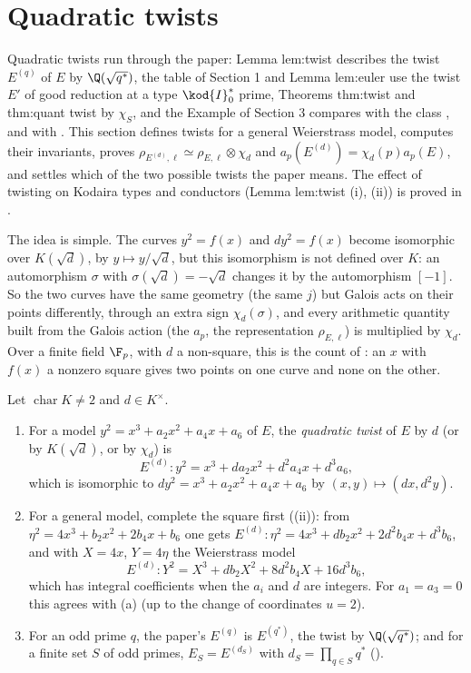 \section{Quadratic twists}\label{sec:ellcurves:twists}

Quadratic twists run through the paper: Lemma lem:twist describes the twist $E^{(q)}$ of $E$ by $\Q(\sqrt{q^*})$, the table of Section 1 and Lemma lem:euler use the twist $E'$ of good reduction at a
type $\kod{I}_0^*$ prime, Theorems thm:twist and thm:quant twist by $\chi_S$, and the Example of Section 3 compares  with the class , and  with . This
section defines twists for a general Weierstrass model, computes their invariants, proves $\rho_{E^{(d)},\ell}\simeq\rho_{E,\ell}\otimes\chi_d$ and $a_p(E^{(d)})=\chi_d(p)a_p(E)$, and settles which of
the two possible twists the paper means. The effect of twisting on Kodaira types and conductors (Lemma lem:twist (i), (ii)) is proved in .

The idea is simple. The curves $y^2=f(x)$ and $dy^2=f(x)$ become isomorphic over $K(\sqrt d)$, by $y\mapsto y/\sqrt d$, but this isomorphism is not defined over $K$:
an automorphism $\sigma$ with $\sigma(\sqrt d)=-\sqrt d$ changes it by the automorphism $[-1]$. So the two curves have the same geometry (the same $j$) but Galois acts on
their points differently, through an extra sign $\chi_d(\sigma)$, and every arithmetic quantity built from the Galois action (the $a_p$, the representation $\rho_{E,\ell}$) is
multiplied by $\chi_d$. Over a finite field $\F_p$, with $d$ a non-square, this is the count of : an $x$ with $f(x)$ a nonzero square gives two points on one curve and none
on the other.

\begin{definition}\label{def:ellcurves:twist}
Let $\operatorname{char}K\ne2$ and $d\in K^\times$.
\begin{enumerate}[label=(\alph*)]
\item For a model $y^2=x^3+a_2x^2+a_4x+a_6$ of $E$, the \emph{quadratic twist} of $E$ by $d$ (or by $K(\sqrt d)$, or by $\chi_d$) is
\[
E^{(d)}\colon y^2=x^3+da_2x^2+d^2a_4x+d^3a_6 ,
\]
which is isomorphic to $dy^2=x^3+a_2x^2+a_4x+a_6$ by $(x,y)\mapsto(dx,d^2y)$.
\item For a general model, complete the square first ((ii)): from $\eta^2=4x^3+b_2x^2+2b_4x+b_6$ one gets $E^{(d)}\colon\eta^2=4x^3+db_2x^2+2d^2b_4x+d^3b_6$, and with
$X=4x$, $Y=4\eta$ the Weierstrass model
\[
E^{(d)}\colon Y^2=X^3+db_2X^2+8d^2b_4X+16d^3b_6,
\]
which has integral coefficients when the $a_i$ and $d$ are integers. For $a_1=a_3=0$ this agrees with (a) (up to the change of coordinates $u=2$).
\item For an odd prime $q$, the paper's $E^{(q)}$ is $E^{(q^*)}$, the twist by $\Q(\sqrt{q^*})$; and for a finite set $S$ of odd primes, $E_S=E^{(d_S)}$ with $d_S=\prod_{q\in S}q^*$
().
\end{enumerate}
\end{definition}

